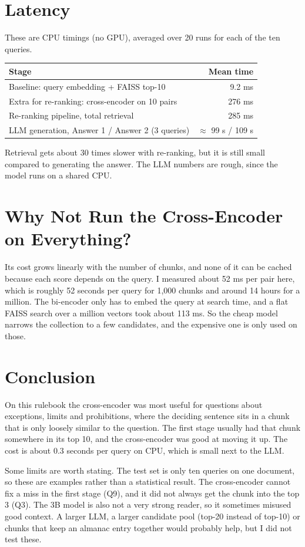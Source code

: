 \documentclass[11pt,a4paper]{article}
\begin{document}
\section{Latency}

These are CPU timings (no GPU), averaged over 20 runs for each of the ten queries.

\begin{table}[h]
\centering
\small
\begin{tabular}{@{}lr@{}}
\toprule
Stage & Mean time \\
\midrule
Baseline: query embedding + FAISS top-10 & 9.2 ms \\
Extra for re-ranking: cross-encoder on 10 pairs & 276 ms \\
Re-ranking pipeline, total retrieval & 285 ms \\
LLM generation, Answer 1 / Answer 2 (3 queries) & $\approx$ 99 s / 109 s \\
\bottomrule
\end{tabular}
\end{table}

Retrieval gets about 30 times slower with re-ranking, but it is still small compared to generating the answer. The LLM numbers are rough, since the model runs on a shared CPU.

\section{Why Not Run the Cross-Encoder on Everything?}

Its cost grows linearly with the number of chunks, and none of it can be cached because each score depends on the query. I measured about 52 ms per pair here, which is roughly 52 seconds per query for 1,000 chunks and around 14 hours for a million. The bi-encoder only has to embed the query at search time, and a flat FAISS search over a million vectors took about 113 ms. So the cheap model narrows the collection to a few candidates, and the expensive one is only used on those.

\section{Conclusion}

On this rulebook the cross-encoder was most useful for questions about exceptions, limits and prohibitions, where the deciding sentence sits in a chunk that is only loosely similar to the question. The first stage usually had that chunk somewhere in its top 10, and the cross-encoder was good at moving it up. The cost is about 0.3 seconds per query on CPU, which is small next to the LLM.

Some limits are worth stating. The test set is only ten queries on one document, so these are examples rather than a statistical result. The cross-encoder cannot fix a miss in the first stage (Q9), and it did not always get the chunk into the top 3 (Q3). The 3B model is also not a very strong reader, so it sometimes misused good context. A larger LLM, a larger candidate pool (top-20 instead of top-10) or chunks that keep an almanac entry together would probably help, but I did not test these.
\end{document}
